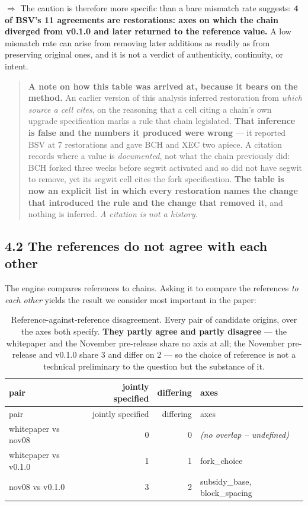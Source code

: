 \documentclass[
]{article}
\begin{document}
\(\Rightarrow\) The caution is therefore more specific than a bare
mismatch rate suggests: \textbf{4 of BSV's 11 agreements are
restorations: axes on which the chain diverged from v0.1.0 and later
returned to the reference value.} A low mismatch rate can arise from
removing later additions as readily as from preserving original ones,
and it is not a verdict of authenticity, continuity, or intent.

\begin{quote}
\textbf{A note on how this table was arrived at, because it bears on the
method.} An earlier version of this analysis inferred restoration from
\emph{which source a cell cites}, on the reasoning that a cell citing a
chain's own upgrade specification marks a rule that chain legislated.
\textbf{That inference is false and the numbers it produced were wrong}
--- it reported BSV at 7 restorations and gave BCH and XEC two apiece. A
citation records where a value is \emph{documented}, not what the chain
previously did: BCH forked three weeks before segwit activated and so
did not have segwit to remove, yet its segwit cell cites the fork
specification. \textbf{The table is now an explicit list in which every
restoration names the change that introduced the rule and the change
that removed it}, and nothing is inferred. \emph{A citation is not a
history.}
\end{quote}

\subsection{4.2 The references do not agree with each
other}\label{the-references-do-not-agree-with-each-other}

The engine compares references to chains. Asking it to compare the
references \emph{to each other} yields the result we consider most
important in the paper:

\begin{longtable}[]{@{}lrrl@{}}
\caption{Reference-against-reference disagreement. Every pair of
candidate origins, over the axes both specify. \textbf{They partly agree
and partly disagree} --- the whitepaper and the November pre-release
share no axis at all; the November pre-release and v0.1.0 share 3 and
differ on 2 --- so the choice of reference is not a technical
preliminary to the question but the substance of it.}\tabularnewline
\toprule\noalign{}
pair & jointly specified & differing & axes \\
\midrule\noalign{}
\endfirsthead
\toprule\noalign{}
pair & jointly specified & differing & axes \\
\midrule\noalign{}
\endhead
\bottomrule\noalign{}
\endlastfoot
whitepaper vs nov08 & 0 & 0 & \emph{(no overlap -- undefined)} \\
whitepaper vs v0.1.0 & 1 & 1 & fork\_choice \\
nov08 vs v0.1.0 & 3 & 2 & subsidy\_base, block\_spacing \\
\end{longtable}
\end{document}
